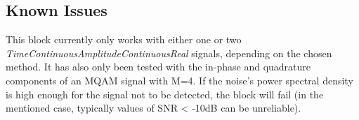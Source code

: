 \begin{refsection}


\subsection*{Known Issues}\label{snrestissues}

This block currently only works with either one or two
\textit{TimeContinuousAmplitudeContinuousReal} signals, depending on the chosen
method. It has also only been tested with the in-phase and quadrature components of an MQAM signal with M=4.
If the noise's power spectral density is high enough for the signal not to be
detected, the block will fail (in the mentioned case, typically
values of SNR < -10dB can be unreliable).





\clearpage
\printbibliography[heading=subbibliography]
\end{refsection}
\cleardoublepage
